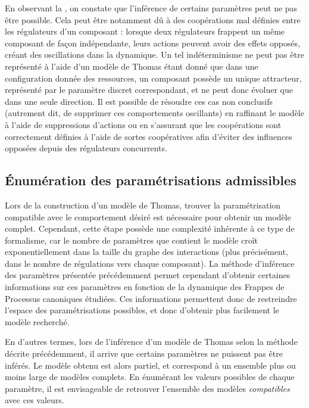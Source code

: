 En observant la , on constate que l'inférence
de certains paramètres peut ne pas être possible.
Cela peut être notamment dû à des coopérations mal définies entre les régulateurs d'un composant :
lorsque deux régulateurs frappent un même composant de façon indépendante, leurs actions peuvent
avoir des effets opposés, créant des oscillations dans la dynamique.
Un tel indéterminisme ne peut pas être représenté à l'aide d'un modèle de Thomas étant donné
que dans une configuration donnée des ressources, un composant possède un unique attracteur,
représenté par le paramètre discret correspondant,
et ne peut donc évoluer que dans une seule direction.
Il est possible de résoudre ces cas non conclusifs
(autrement dit, de supprimer ces comportements oscillants)
en raffinant le modèle à l'aide de suppressions d'actions ou
en s'assurant que les coopérations sont correctement définies à l'aide de sortes coopératives
afin d'éviter des influences opposées depuis des régulateurs concurrents.



\subsection{Énumération des paramétrisations admissibles}

Lors de la construction d'un modèle de Thomas, trouver la paramétrisation compatible avec
le comportement désiré est nécessaire pour obtenir un modèle complet.
Cependant, cette étape possède une complexité inhérente à ce type de formalisme,
car le nombre de paramètres que contient le modèle croît exponentiellement dans
la taille du graphe des interactions
(plus précisément, dans le nombre de régulations vers chaque composant).
La méthode d'inférence des paramètres présentée précédemment permet cependant d'obtenir
certaines informations sur ces paramètres en fonction de la dynamique des Frappes de Processus
canoniques étudiées.
Ces informations permettent donc de restreindre l'espace des paramétrisations possibles,
et donc d'obtenir plus facilement le modèle recherché.

En d'autres termes,
lors de l'inférence d'un modèle de Thomas selon la méthode décrite précédemment,
il arrive que certains paramètres ne puissent pas être inférés.
Le modèle obtenu est alors partiel, et correspond à un ensemble
plus ou moins large de modèles complets.
En énumérant les valeurs possibles de chaque paramètre, il est envisageable de retrouver
l'ensemble des modèles \emph{compatibles} avec ces valeurs.

